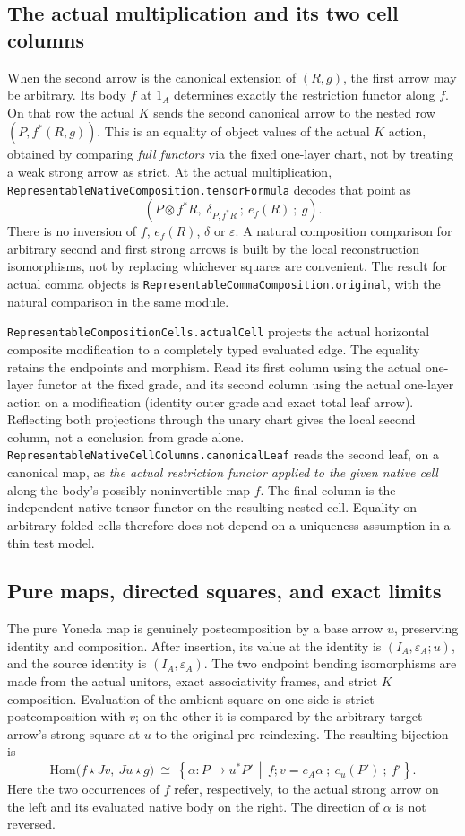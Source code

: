 \documentclass[11pt]{article}
\newcommand{\code}[1]{\nolinkurl{#1}}
\begin{document}
\subsection*{The actual multiplication and its two cell columns}
When the second arrow is the canonical extension of $(R,g)$, the first arrow may be arbitrary. Its body $f$ at $1_A$ determines exactly the restriction functor along $f$. On that row the actual $K$ sends the second canonical arrow to the nested row $(P,f^*(R,g))$. This is an equality of object values of the actual $K$ action, obtained by comparing \emph{full functors} via the fixed one-layer chart, not by treating a weak strong arrow as strict. At the actual multiplication, \code{RepresentableNativeComposition.tensorFormula} decodes that point as
\[
  \left(P\otimes f^*R,\;
    \delta_{P,f^*R}\ ;\ e_f(R)\ ;\ g\right).
\]
There is no inversion of $f$, $e_f(R)$, $\delta$ or $\varepsilon$. A natural composition comparison for arbitrary second and first strong arrows is built by the local reconstruction isomorphisms, not by replacing whichever squares are convenient. The result for actual comma objects is \code{RepresentableCommaComposition.original}, with the natural comparison in the same module.

\code{RepresentableCompositionCells.actualCell} projects the actual horizontal composite modification to a completely typed evaluated edge. The equality retains the endpoints and morphism. Read its first column using the actual one-layer functor at the fixed grade, and its second column using the actual one-layer action on a modification (identity outer grade and exact total leaf arrow). Reflecting both projections through the unary chart gives the local second column, not a conclusion from grade alone. \code{RepresentableNativeCellColumns.canonicalLeaf} reads the second leaf, on a canonical map, as \emph{the actual restriction functor applied to the given native cell} along the body's possibly noninvertible map $f$. The final column is the independent native tensor functor on the resulting nested cell. Equality on arbitrary folded cells therefore does not depend on a uniqueness assumption in a thin test model.

\subsection*{Pure maps, directed squares, and exact limits}
The pure Yoneda map is genuinely postcomposition by a base arrow $u$, preserving identity and composition. After insertion, its value at the identity is $(I_A,\varepsilon_A;u)$, and the source identity is $(I_A,\varepsilon_A)$. The two endpoint bending isomorphisms are made from the actual unitors, exact associativity frames, and strict $K$ composition. Evaluation of the ambient square on one side is strict postcomposition with $v$; on the other it is compared by the arbitrary target arrow's strong square at $u$ to the original pre-reindexing. The resulting bijection is
\[
\mathrm{Hom}\bigl(f\star Jv,\ Ju\star g\bigr)
\ \cong\
\left\{\alpha:P\to u^*P'\,\middle|\,
 f;v=e_A\alpha\ ;\ e_u(P')\ ;\ f'\right\}.
\]
Here the two occurrences of $f$ refer, respectively, to the actual strong arrow on the left and its evaluated native body on the right. The direction of $\alpha$ is not reversed.
\end{document}
